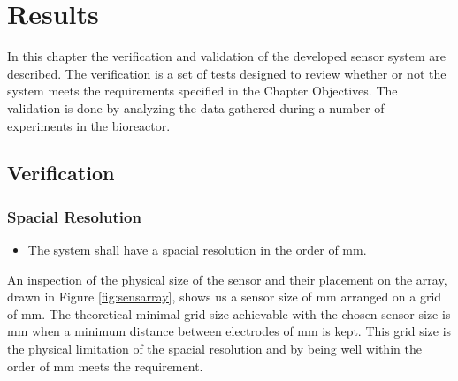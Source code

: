 \chapter{Results}

In this chapter the verification and validation of the developed sensor system are described. The verification is a set of tests designed to review whether or not the system meets the requirements specified in the Chapter Objectives. The validation is done by analyzing the data gathered during a number of experiments in the bioreactor.

\section{Verification}

\subsection{Spacial Resolution}

\begin{itemize}
\item The system shall have a spacial resolution in the order of \unit[10]{mm}.
\end{itemize}

An inspection of the physical size of the sensor and their placement on the array, drawn in Figure \ref{fig:sensarray}, shows us a sensor size of \unit[10x11]{mm} arranged on a grid of \unit[25x50]{mm}. The theoretical minimal grid size achievable with the chosen sensor size is \unit[11x12]{mm} when a minimum distance between electrodes of \unit[1]{mm} is kept.
This grid size is the physical limitation of the spacial resolution and by being well within the order of \unit[10]{mm} meets the requirement.\\

